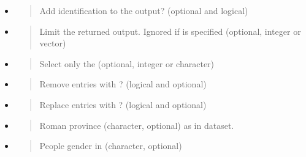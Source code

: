 \documentclass[a4paper,12pt,english]{sphinxhowto}
\begin{document}
\begin{itemize}
\begin{description}
\end{description}

\item {} 
\begin{quote}

Add identification to the output? (optional and logical)
\end{quote}

\item {} 
\begin{quote}

Limit the returned output. Ignored if  is specified (optional, integer or vector)
\end{quote}

\item {} 
\begin{quote}

Select only the    (optional, integer or character)
\end{quote}

\item {} 
\begin{quote}

Remove entries with ? (logical and optional)
\end{quote}

\item {} 
\begin{quote}

Replace entries with ? (logical and optional)
\end{quote}

\item {} 
\begin{quote}

Roman province (character, optional) as in  dataset.
\end{quote}

\item {} 
\begin{quote}

People gender in  (character, optional)
\end{quote}

\end{itemize}
\end{document}
